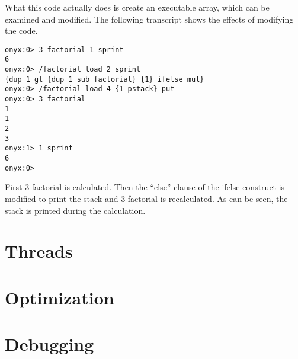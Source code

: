 What this code actually does is create an executable array, which can be
examined and modified.  The following transcript shows the effects of modifying
the code.

\begin{verbatim}
onyx:0> 3 factorial 1 sprint
6
onyx:0> /factorial load 2 sprint
{dup 1 gt {dup 1 sub factorial} {1} ifelse mul}
onyx:0> /factorial load 4 {1 pstack} put
onyx:0> 3 factorial 
1
1
2
3
onyx:1> 1 sprint
6
onyx:0>
\end{verbatim}

First 3 factorial is calculated.  Then the ``else'' clause of the ifelse
construct is modified to print the stack and 3 factorial is recalculated.  As
can be seen, the stack is printed during the calculation.

\section{Threads}

\section{Optimization}

\section{Debugging}
